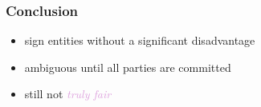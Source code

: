 \begin{frame}
	\frametitle{Conclusion}

  \begin{center}  
    \begin{itemize}
      \setlength\itemsep{1em}
      \item sign entities without a significant disadvantage
      \item ambiguous until all parties are committed
      \item still not \textcolor{Plum}{\textit{truly fair}}
    \end{itemize}
  \end{center}
\end{frame}